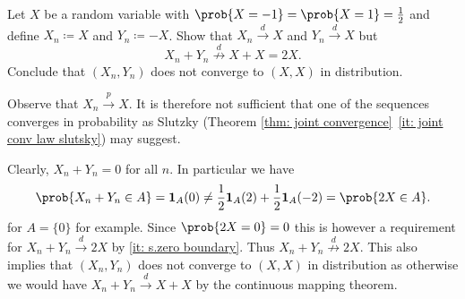 
\begin{exercise}[subtitle={Counterexample joint convergence \Coffeecup}]
    \label{ex: counterexample joint convergence}
    Let \(X\) be a random variable with \(\prob{X=-1} = \prob{X=1} = \frac12\)
    and define \(X_n \coloneq X\) and \(Y_n \coloneq -X\). Show that \(X_n
    \overset{d}\to X\) and
    \(Y_n \overset{d}\to X\) but 
    \[
        X_n + Y_n \overset{d}{\not\to} X + X = 2X.
    \]
    Conclude that \((X_n, Y_n)\) does not converge to \((X,X)\) in distribution.
    \begin{remark}
        Observe that \(X_n \overset{p}\to X\). It is therefore not sufficient
        that one of the sequences converges in probability as Slutzky (Theorem
        \ref{thm: joint convergence}~\ref{it: joint conv law slutsky}) may
        suggest.
    \end{remark}
\end{exercise}

\begin{solution}
    Clearly, \(X_n + Y_n = 0\) for all \(n\). In particular we have
    \[
        \prob{X_n + Y_n \in A} = \ind{A}(0)
        \neq \frac12\ind{A}(2) + \frac12 \ind{A}(-2)
        = \prob{2X \in A}.
    \]
    for \(A= \{0\}\) for example. Since \(\prob{2X = 0} = 0\) this is
    however a requirement for \(X_n + Y_n \overset{d}\to 2X\) by \ref{it:
    s.zero boundary}. Thus \(X_n + Y_n \overset{d}{\not\to} 2X\).  This also
    implies that \((X_n, Y_n)\) does not converge to \((X,X)\) in
    distribution as otherwise we would have \(X_n + Y_n \overset{d}\to X +
    X\) by the continuous mapping theorem.
\end{solution}

